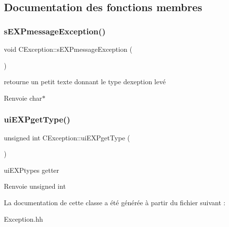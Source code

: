 \subsection{Documentation des fonctions membres}
\mbox{\label{classCException_a7b5dd75546b7c7bf13206633c8237336}} 
\subsubsection{\texorpdfstring{s\+E\+X\+Pmessage\+Exception()}{sEXPmessageException()}}
{\footnotesize\ttfamily void C\+Exception\+::s\+E\+X\+Pmessage\+Exception (\begin{DoxyParamCaption}{ }\end{DoxyParamCaption})}



retourne un petit texte donnant le type d\textquotesingle{}exeption levé 

\begin{DoxyReturn}{Renvoie}
char$\ast$ 
\end{DoxyReturn}
\mbox{\label{classCException_a916fc87bccf954a5e112967e4f90bb98}} 
\subsubsection{\texorpdfstring{ui\+E\+X\+Pget\+Type()}{uiEXPgetType()}}
{\footnotesize\ttfamily unsigned int C\+Exception\+::ui\+E\+X\+Pget\+Type (\begin{DoxyParamCaption}{ }\end{DoxyParamCaption})}



ui\+E\+X\+Ptype\textquotesingle{}s getter 

\begin{DoxyReturn}{Renvoie}
unsigned int 
\end{DoxyReturn}


La documentation de cette classe a été générée à partir du fichier suivant \+:\begin{DoxyCompactItemize}
\item 
Exception.\+hh\end{DoxyCompactItemize}
